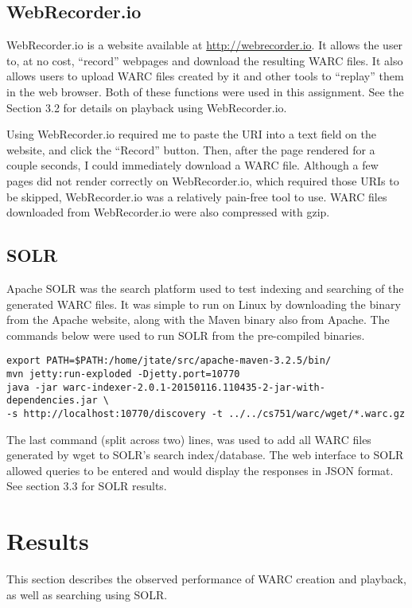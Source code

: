 \documentclass[a4paper,12pt]{article}
\begin{document}
\subsection{WebRecorder.io}
WebRecorder.io is a website available at \url{http://webrecorder.io}. It allows the user to, at no cost,
``record'' webpages and download the resulting WARC files. It also allows users to upload WARC files created
by it and other tools to ``replay'' them in the web browser. Both of these functions were used in this
assignment. See the Section 3.2 for details on playback using WebRecorder.io.

Using WebRecorder.io required me to paste the URI into a text field on the website, and click the ``Record''
button. Then, after the page rendered for a couple seconds, I could immediately download a WARC file.
Although a few pages did not render correctly on WebRecorder.io, which required those URIs to be skipped,
WebRecorder.io was a relatively pain-free tool to use. WARC files downloaded from WebRecorder.io were also
compressed with gzip.

\subsection{SOLR}
Apache SOLR was the search platform used to test indexing and searching of the generated WARC files. It was
simple to run on Linux by downloading the binary from the Apache website, along with the Maven binary also
from Apache. The commands below were used to run SOLR from the pre-compiled binaries.
\begin{lstlisting}[basicstyle=\ttfamily,caption={Downloading Tweets}]
export PATH=$PATH:/home/jtate/src/apache-maven-3.2.5/bin/
mvn jetty:run-exploded -Djetty.port=10770
java -jar warc-indexer-2.0.1-20150116.110435-2-jar-with-dependencies.jar \
-s http://localhost:10770/discovery -t ../../cs751/warc/wget/*.warc.gz
\end{lstlisting}
The last command (split across two) lines, was used to add all WARC files generated by wget to SOLR's
search index/database. The web interface to SOLR allowed queries to be entered and would display the
responses in JSON format. See section 3.3 for SOLR results.

\section{Results}
This section describes the observed performance of WARC creation and playback, as well as searching using
SOLR.
\end{document}
